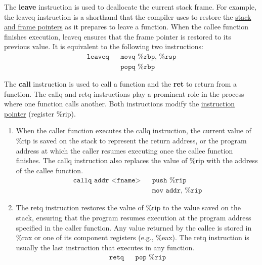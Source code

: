   \begin{definition}[Leave]
    \label{def:leave}
    The \textbf{leave} instruction is used to deallocate the current stack frame. For example, the leaveq instruction is a shorthand that the compiler uses to restore the \hyperref[def:stack-and-frame-pointers]{stack and frame pointers} as it prepares to leave a function. When the callee function finishes execution, leaveq ensures that the frame pointer is restored to its previous value. It is equivalent to the following two instructions: 
    \begin{align*}
      \texttt{leaveq} && \texttt{movq \%rbp, \%rsp} \\
                      && \texttt{popq \%rbp}
    \end{align*}
  \end{definition}

  \begin{definition}
    \label{def:call-and-return}
    The \textbf{call} instruction is used to call a function and the \textbf{ret} to return from a function. The callq and retq instructions play a prominent role in the process where one function calls another. Both instructions modify the \hyperref[def:instruction-pointer]{instruction pointer} (register \%rip). 

    \begin{enumerate}
      \item When the caller function executes the callq instruction, the current value of \%rip is saved on the stack to represent the return address, or the program address at which the caller resumes executing once the callee function finishes. The callq instruction also replaces the value of \%rip with the address of the callee function. 
        \begin{align*}
          \texttt{callq addr <fname>} && \texttt{push \%rip} \\
                                      && \texttt{mov addr, \%rip}
        \end{align*}
      \item The retq instruction restores the value of \%rip to the value saved on the stack, ensuring that the program resumes execution at the program address specified in the caller function. Any value returned by the callee is stored in \%rax or one of its component registers (e.g., \%eax). The retq instruction is usually the last instruction that executes in any function.
        \begin{align*}
          \texttt{retq} && \texttt{pop \%rip} \\
        \end{align*}
    \end{enumerate}
  \end{definition}

